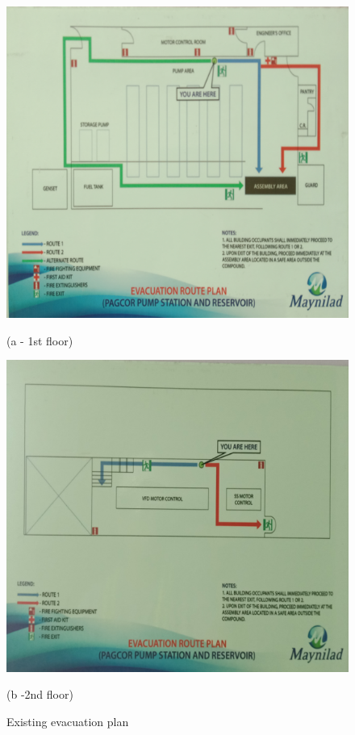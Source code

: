 \begin{figure}[h]
	\begin{minipage}[b]{0.5\linewidth}
		\centering
		\includegraphics[width=\textwidth]{figures/ch04_fig_safety01}
		\caption*{(a - 1st floor)}
	\end{minipage}
	\hspace{0.05cm}
	\begin{minipage}[b]{0.5\linewidth}
		\centering
		\includegraphics[width=\textwidth]{figures/ch04_fig_safety02}
		\caption*{(b -2nd floor)}
	\end{minipage}
	\caption{Existing evacuation plan}
	\label{ch04_fig_safety01}
\end{figure}


